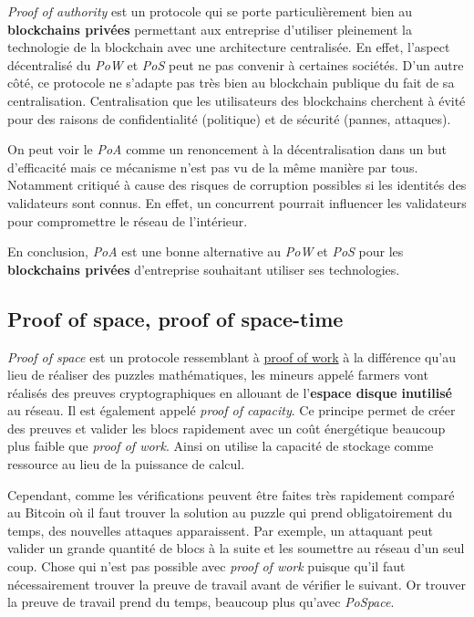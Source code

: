 \emph{Proof of authority} est un protocole qui se porte particulièrement bien au \textbf{blockchains privées} permettant aux entreprise d'utiliser pleinement la technologie de la blockchain avec une architecture centralisée. En effet, l'aspect décentralisé du \emph{PoW} et \emph{PoS} peut ne pas convenir à certaines sociétés. D'un autre côté, ce protocole ne s'adapte pas très bien au blockchain publique du fait de sa centralisation. Centralisation que les utilisateurs des blockchains cherchent à évité pour des raisons de confidentialité (politique) et de sécurité (pannes, attaques).

On peut voir le \emph{PoA} comme un renoncement à la décentralisation dans un but d'efficacité mais ce mécanisme n'est pas vu de la même manière par tous. Notamment critiqué à cause des risques de corruption possibles si les identités des validateurs sont connus. En effet, un concurrent pourrait influencer les validateurs pour compromettre le réseau de l'intérieur.

En conclusion, \emph{PoA} est une bonne alternative au \emph{PoW} et \textit{PoS} pour les \textbf{blockchains privées} d'entreprise souhaitant utiliser ses technologies.

\subsection{Proof of space, proof of space-time}
\label{consensus:pospace}

\emph{Proof of space} est un protocole ressemblant à \hyperref[consensus:pow]{proof of work} à la différence qu'au lieu de réaliser des puzzles mathématiques, les mineurs appelé farmers vont réalisés des preuves cryptographiques en allouant de l'\textbf{espace disque inutilisé} au réseau. Il est également appelé \emph{proof of capacity}. Ce principe permet de créer des preuves et valider les blocs rapidement avec un coût énergétique beaucoup plus faible que \emph{proof of work}. Ainsi on utilise la capacité de stockage comme ressource au lieu de la puissance de calcul.

Cependant, comme les vérifications peuvent être faites très rapidement comparé au Bitcoin où il faut trouver la solution au puzzle qui prend obligatoirement du temps, des nouvelles attaques apparaissent. Par exemple, un attaquant peut valider un grande quantité de blocs à la suite et les soumettre au réseau d'un seul coup. Chose qui n'est pas possible avec \emph{proof of work} puisque qu'il faut nécessairement trouver la preuve de travail avant de vérifier le suivant. Or trouver la preuve de travail prend du temps, beaucoup plus qu'avec \emph{PoSpace}. 

